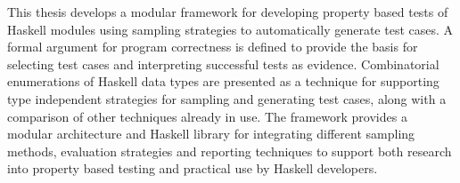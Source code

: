 
This thesis develops a modular framework for developing 
property based tests of Haskell modules
using sampling strategies to automatically generate test cases.
A formal argument for program correctness is defined
to provide the basis for selecting test cases and interpreting successful tests as evidence.
Combinatorial enumerations of Haskell data types
are presented as a technique for supporting 
type independent strategies for sampling and generating test cases,
along with a comparison of other techniques already in use.
The \GC framework provides a modular architecture and Haskell library for 
integrating different sampling methods, evaluation strategies and reporting techniques to support
both research into property based testing and practical use by Haskell developers.

